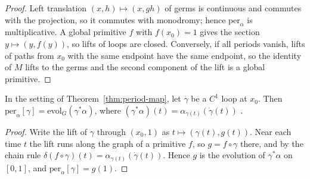 \begin{proof}
  \leanok
  Left translation $(x, h) \mapsto (x, gh)$ of germs is continuous and commutes with the
  projection, so it commutes with monodromy; hence $\mathrm{per}_\alpha$ is multiplicative. A global
  primitive $f$ with $f(x_0) = 1$ gives the section $y \mapsto (y, f(y))$, so lifts of loops are
  closed. Conversely, if all periods vanish, lifts of paths from $x_0$ with the same endpoint have
  the same endpoint, so the identity of $M$ lifts to the germs and the second component of the
  lift is a global primitive.
\end{proof}

\begin{theorem}
  \label{thm:period-evol}
  \leanok
  In the setting of Theorem~\ref{thm:period-map}, let $\gamma$ be a $C^1$ loop at $x_0$. Then
  $\mathrm{per}_\alpha[\gamma] = \mathrm{evol}_G(\gamma^*\alpha)$, where
  $(\gamma^*\alpha)(t) = \alpha_{\gamma(t)}(\dot\gamma(t))$ \cite[Lemma 6.1.11]{GN26}.
\end{theorem}

\begin{proof}
  \leanok
  Write the lift of $\gamma$ through $(x_0, 1)$ as $t \mapsto (\gamma(t), g(t))$. Near each time
  $t$ the lift runs along the graph of a primitive $f$, so $g = f \circ \gamma$ there, and by the
  chain rule $\delta(f \circ \gamma)(t) = \alpha_{\gamma(t)}(\dot\gamma(t))$. Hence $g$ is the
  evolution of $\gamma^*\alpha$ on $[0, 1]$, and $\mathrm{per}_\alpha[\gamma] = g(1)$.
\end{proof}


